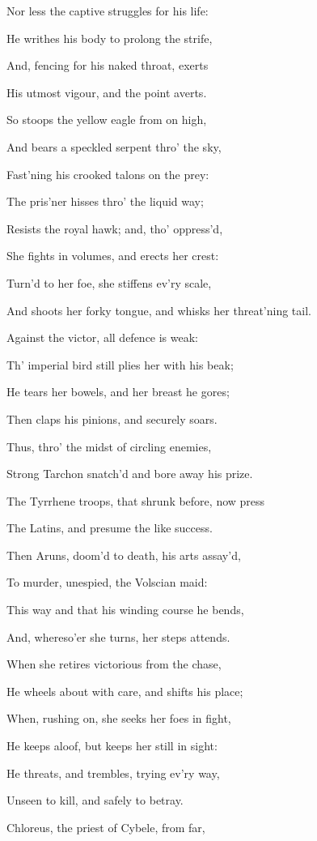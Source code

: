 Nor less the captive struggles for his life:

He writhes his body to prolong the strife,

And, fencing for his naked throat, exerts

His utmost vigour, and the point averts.

So stoops the yellow eagle from on high,

And bears a speckled serpent thro’ the sky,

Fast’ning his crooked talons on the prey:

The pris’ner hisses thro’ the liquid way;

Resists the royal hawk; and, tho’ oppress’d,

She fights in volumes, and erects her crest:

Turn’d to her foe, she stiffens ev’ry scale,

And shoots her forky tongue, and whisks her threat’ning tail.

Against the victor, all defence is weak:

Th’ imperial bird still plies her with his beak;

He tears her bowels, and her breast he gores;

Then claps his pinions, and securely soars.

Thus, thro’ the midst of circling enemies,

Strong Tarchon snatch’d and bore away his prize.

The Tyrrhene troops, that shrunk before, now press

The Latins, and presume the like success.

Then Aruns, doom’d to death, his arts assay’d,

To murder, unespied, the Volscian maid:

This way and that his winding course he bends,

And, whereso’er she turns, her steps attends.

When she retires victorious from the chase,

He wheels about with care, and shifts his place;

When, rushing on, she seeks her foes in fight,

He keeps aloof, but keeps her still in sight:

He threats, and trembles, trying ev’ry way,

Unseen to kill, and safely to betray.

Chloreus, the priest of Cybele, from far,

